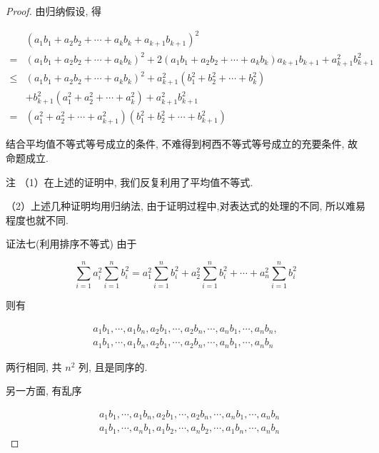 \begin{proof}
	由归纳假设, 得
	
	$$
	\begin{aligned}
	& \left(a_{1} b_{1}+a_{2} b_{2}+\cdots+a_{k} b_{k}+a_{k+1} b_{k+1}\right)^{2} \\
	= & \left(a_{1} b_{1}+a_{2} b_{2}+\cdots+a_{k} b_{k}\right)^{2}+2\left(a_{1} b_{1}+a_{2} b_{2}+\cdots+a_{k} b_{k}\right) a_{k+1} b_{k+1}+a_{k+1}^{2} b_{k+1}^{2} \\
	\leqslant & \left(a_{1} b_{1}+a_{2} b_{2}+\cdots+a_{k} b_{k}\right)^{2}+a_{k+1}^{2}\left(b_{1}^{2}+b_{2}^{2}+\cdots+b_{k}^{2}\right) \\
	& +b_{k+1}^{2}\left(a_{1}^{2}+a_{2}^{2}+\cdots+a_{k}^{2}\right)+a_{k+1}^{2} b_{k+1}^{2} \\
	= & \left(a_{1}^{2}+a_{2}^{2}+\cdots+a_{k+1}^{2}\right)\left(b_{1}^{2}+b_{2}^{2}+\cdots+b_{k+1}^{2}\right)
	\end{aligned}
	$$
	
	结合平均值不等式等号成立的条件, 不难得到柯西不等式等号成立的充要条件, 故命题成立.
	
	注 （1）在上述的证明中, 我们反复利用了平均值不等式.
	
	（2）上述几种证明均用归纳法, 由于证明过程中,对表达式的处理的不同, 所以难易程度也就不同.
	
	证法七(利用排序不等式) 由于
	
	$$
	\sum_{i=1}^{n} a_{i}^{2} \sum_{i=1}^{n} b_{i}^{2}=a_{1}^{2} \sum_{i=1}^{n} b_{i}^{2}+a_{2}^{2} \sum_{i=1}^{n} b_{i}^{2}+\cdots+a_{n}^{2} \sum_{i=1}^{n} b_{i}^{2}
	$$
	
	则有
	
	$$
	\begin{gathered}
	a_{1} b_{1}, \cdots, a_{1} b_{n}, a_{2} b_{1}, \cdots, a_{2} b_{n}, \cdots, a_{n} b_{1}, \cdots, a_{n} b_{n}, \\
	a_{1} b_{1}, \cdots, a_{1} b_{n}, a_{2} b_{1}, \cdots, a_{2} b_{n}, \cdots, a_{n} b_{1}, \cdots, a_{n} b_{n}
	\end{gathered}
	$$
	
	两行相同, 共 $n^{2}$ 列, 且是同序的.
	
	另一方面, 有乱序
	
	$$
	\begin{aligned}
	& a_{1} b_{1}, \cdots, a_{1} b_{n}, a_{2} b_{1}, \cdots, a_{2} b_{n}, \cdots, a_{n} b_{1}, \cdots, a_{n} b_{n} \\
	& a_{1} b_{1}, \cdots, a_{n} b_{1}, a_{1} b_{2}, \cdots, a_{n} b_{2}, \cdots, a_{1} b_{n}, \cdots, a_{n} b_{n}
	\end{aligned}
	$$
	

\end{proof}
